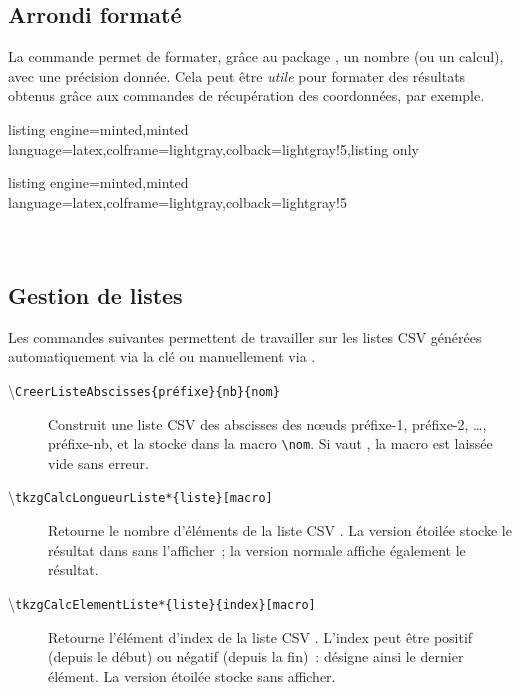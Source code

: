 \documentclass[11pt,a4paper]{ltxdoc}
\begin{document}
\subsection{Arrondi formaté}\label{numarrond}

La commande  permet de formater, grâce au package , un nombre (ou un calcul), avec une précision donnée. Cela peut être \textit{utile} pour formater des résultats obtenus grâce aux commandes de récupération des coordonnées, par exemple.

\begin{tcblisting}{listing engine=minted,minted language=latex,colframe=lightgray,colback=lightgray!5,listing only}
\end{tcblisting}

\begin{tcblisting}{listing engine=minted,minted language=latex,colframe=lightgray,colback=lightgray!5}
\\
\\
\\
\end{tcblisting}

\subsection{Gestion de listes}\label{gestlistes}

Les commandes suivantes permettent de travailler sur les listes \textsf{CSV} générées automatiquement via la clé  ou manuellement via
.

\begin{description}
  \item[\textbackslash\texttt{CreerListeAbscisses\{préfixe\}\{nb\}\{nom\}}]
  Construit une liste CSV des abscisses des nœuds \textsf{préfixe-1},
  \textsf{préfixe-2}, \ldots, \textsf{préfixe-nb}, et la stocke dans la macro \verb|\nom|. Si  vaut , la macro est laissée vide sans erreur.
  \item[\textbackslash\texttt{tkzgCalcLongueurListe{*}\{liste\}{[macro]}}]
  Retourne le nombre d'éléments de la liste CSV .
  La version étoilée stocke le résultat dans  sans
  l'afficher~; la version normale affiche également le résultat.
  \item[\textbackslash\texttt{tkzgCalcElementListe{*}\{liste\}\{index\}{[macro]}}]
  Retourne l'élément d'index  de la liste CSV
  . L'index peut être positif (depuis le début) ou négatif
  (depuis la fin)~:  désigne ainsi le dernier élément.
  La version étoilée stocke sans afficher.
\end{description}
\end{document}
